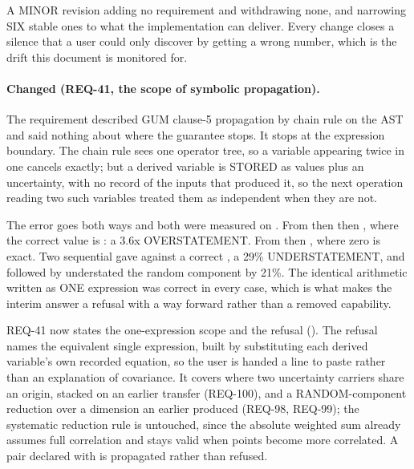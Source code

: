 A MINOR revision adding no requirement and withdrawing none, and
narrowing SIX stable ones to what the implementation can deliver. Every
change closes a silence that a user could only discover by getting a
wrong number, which is the drift this document is monitored for.

\paragraph{Changed (REQ-41, the scope of symbolic propagation).} The
requirement described GUM clause-5 propagation by chain rule on the AST
and said nothing about where the guarantee stops. It stops at the
expression boundary. The chain rule sees one operator tree, so a
variable appearing twice in one  cancels exactly; but a
derived variable is STORED as values plus an uncertainty, with no record
of the inputs that produced it, so the next operation reading two such
variables treated them as independent when they are not.

The error goes both ways and both were measured on . From
 then  then ,
 where the correct value is : a 3.6x
OVERSTATEMENT. From  then ,
 where zero is exact. Two sequential
 gave  against a correct
, a 29\% UNDERSTATEMENT, and  followed by
 understated the random component by 21\%. The identical
arithmetic written as ONE expression was correct in every case, which is
what makes the interim answer a refusal with a way forward rather than a
removed capability.

REQ-41 now states the one-expression scope and the refusal
(). The refusal names the equivalent
single expression, built by substituting each derived variable's own
recorded equation, so the user is handed a line to paste rather than an
explanation of covariance. It covers  where two
uncertainty carriers share an origin,  stacked
on an earlier transfer (REQ-100), and a RANDOM-component reduction over
a dimension an earlier  produced (REQ-98, REQ-99); the
systematic reduction rule is untouched, since the absolute weighted sum
already assumes full correlation and stays valid when points become
more correlated. A pair declared with  is
propagated rather than refused.

